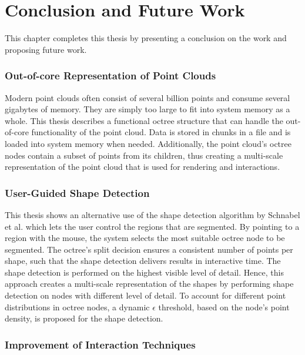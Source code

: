 \chapter{Conclusion and Future Work}
\label{chap:conclusion}


This chapter completes this thesis by presenting a conclusion on the work and proposing future work.

\subsection*{Out-of-core Representation of Point Clouds}

Modern point clouds often consist of several billion points and consume several gigabytes of memory. They are simply too large to fit into system memory as a whole. This thesis describes a functional octree structure that can handle the out-of-core functionality of the point cloud. Data is stored in chunks in a file and is loaded into system memory when needed. Additionally, the point cloud's octree nodes contain a subset of points from its children, thus creating a multi-scale representation of the point cloud that is used for rendering and interactions. 


\subsection*{User-Guided Shape Detection}

This thesis shows an alternative use of the shape detection algorithm by Schnabel et al. \cite{schnabel-2007-efficient} which lets the user control the regions that are segmented. By pointing to a region with the mouse, the system selects the most suitable octree node to be segmented. The octree's split decision ensures a consistent number of points per shape, such that the shape detection delivers results in interactive time. The shape detection is performed on the highest visible level of detail. Hence, this approach creates a multi-scale representation of the shapes by performing shape detection on nodes with different level of detail. To account for different point distributions in octree nodes, a dynamic $\epsilon$ threshold, based on the node's point density, is proposed for the shape detection. 


\subsection*{Improvement of Interaction Techniques}

